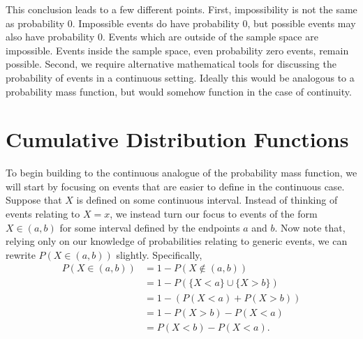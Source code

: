 \documentclass[
  letterpaper,
  DIV=11,
  numbers=noendperiod]{scrreprt}
\theoremstyle{definition}
\theoremstyle{definition}
\theoremstyle{definition}
\theoremstyle{remark}
\begin{document}
\begin{tcolorbox}
This conclusion leads to a few different points. First, impossibility is
not the same as probability \(0\). Impossible events do have probability
\(0\), but possible events may also have probability \(0\). Events which
are outside of the sample space are impossible. Events inside the sample
space, even probability zero events, remain possible. Second, we require
alternative mathematical tools for discussing the probability of events
in a continuous setting. Ideally this would be analogous to a
probability mass function, but would somehow function in the case of
continuity.

\end{tcolorbox}



\section{Cumulative Distribution
Functions}\label{cumulative-distribution-functions}

To begin building to the continuous analogue of the probability mass
function, we will start by focusing on events that are easier to define
in the continuous case. Suppose that \(X\) is defined on some continuous
interval. Instead of thinking of events relating to \(X=x\), we instead
turn our focus to events of the form \(X \in (a,b)\) for some interval
defined by the endpoints \(a\) and \(b\). Now note that, relying only on
our knowledge of probabilities relating to generic events, we can
rewrite \(P(X\in(a,b))\) slightly. Specifically, \begin{align*}
P(X\in(a,b)) &= 1 - P(X\not\in(a,b))\\
&= 1 - P(\{X < a\}\cup\{X > b\}) \\
&= 1 - \left(P(X < a) + P(X > b)\right)\\
&= 1 - P(X > b) - P(X < a)\\
&= P(X < b) - P(X < a).\end{align*}
\end{document}
